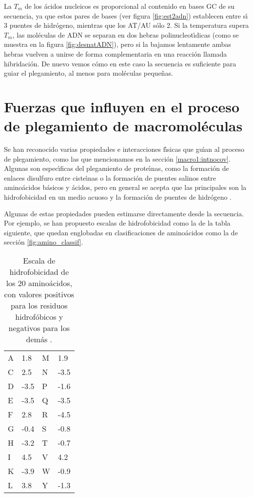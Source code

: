 La $T_{m}$ de los \'{a}cidos nucleicos es proporcional al contenido en bases GC de su secuencia, 
ya que estos pares de bases (ver figura \ref{fig:est2adn}) establecen entre s\'\i{} 3 puentes de hidr\'{o}geno, 
mientras que los AT/AU s\'{o}lo 2. Si la temperatura supera $T_{m}$, las mol\'{e}culas de ADN se separan 
en dos hebras polinucleot\'\i{}dicas (como se muestra en la figura \ref{fig:desnatADN}), pero si la 
bajamos lentamente ambas hebras vuelven a unirse de forma complementaria en una reacci\'{o}n llamada 
hibridaci\'{o}n. De nuevo vemos c\'{o}mo en este caso la secuencia es suficiente para guiar el plegamiento, 
al menos para mol\'{e}culas peque\~nas.\\

\section{Fuerzas que influyen en el proceso de plegamiento de macromol\'{e}culas}

Se han reconocido varias propiedades e interacciones f\'\i{}sicas que gu\'\i{}an al proceso de plegamiento, 
como las que mencionamos en la secci\'{o}n \ref{macro1:intnocov}. Algunas son espec\'\i{}ficas
del plegamiento de prote\'\i{}nas, como la formaci\'{o}n de enlaces disulfuro entre ciste\'\i{}nas o la formaci\'{o}n
de puentes salinos entre amino\'{a}cidos b\'{a}sicos y \'{a}cidos, pero en general se acepta que las principales
son la hidrofobicidad en un medio acuoso y la formaci\'{o}n de puentes de hidr\'{o}geno 
\citep{Dill1990,Lehninger1982,Mathews1999}.

Algunas de estas propiedades pueden estimarse directamente desde la secuencia. Por ejemplo, se han
propuesto escalas de hidrofobicidad como la de la tabla siguiente, %
que quedan englobadas en clasificaciones de amino\'{a}cidos como la de secci\'{o}n \ref{fig:amino_classif}.

\begin{table}[h]
\begin{center}
\begin{scriptsize}
\begin{tabular}{|l|l|l|l|}\hline
A & 1.8 & M & 1.9\\   
C & 2.5 & N & -3.5\\
D & -3.5 & P & -1.6\\ 
E & -3.5 & Q & -3.5\\  
F & 2.8 & R & -4.5\\
G & -0.4 & S & -0.8\\      
H & -3.2 & T & -0.7\\    
I & 4.5 & V & 4.2\\   
K & -3.9 & W & -0.9\\
L & 3.8 & Y & -1.3\\
\end{tabular}
\end{scriptsize}
\end{center}
\caption%
{Escala de hidrofobicidad de los 20 amino\'{a}cidos, con valores positivos para los residuos hidrof\'{o}bicos
y negativos para los dem\'{a}s \citep{Kyte1982}.}
\label{tab:hidrof}
\end{table} 

